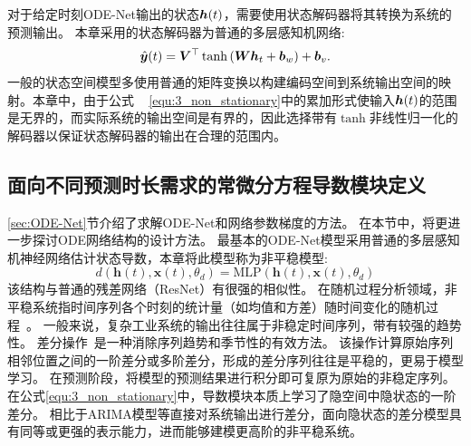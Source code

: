 对于给定时刻ODE-Net输出的状态$\boldsymbol h(t)$，需要使用状态解码器将其转换为系统的预测输出。
本章采用的状态解码器为普通的多层感知机网络:
\begin{equation}
    \hat{\boldsymbol y}(t) = \boldsymbol{V}^{\top} \tanh \left(\boldsymbol{W}\boldsymbol{h}_{t}+\boldsymbol{b}_{w}\right)+\boldsymbol b_{v}.
\end{equation}
一般的状态空间模型多使用普通的矩阵变换以构建编码空间到系统输出空间的映射。本章中，由于公式
~ \eqref{equ:3_non_stationary}中的累加形式使输入$\boldsymbol h(t)$的范围是无界的，而实际系统的输出空间是有界的，因此选择带有$\tanh$非线性归一化的解码器以保证状态解码器的输出在合理的范围内。



\subsection{面向不同预测时长需求的常微分方程导数模块定义}
\label{sec:derivative}
\ref{sec:ODE-Net}节介绍了求解ODE-Net和网络参数梯度的方法。
在本节中，将更进一步探讨ODE网络结构的设计方法。
最基本的ODE-Net模型采用普通的多层感知机神经网络估计状态导数\cite{chen2018neural}，本章将此模型称为非平稳模型:
\begin{equation}
\label{equ:3_non_stationary}
d\left(\boldsymbol{h}(t), \boldsymbol{x}(t), \theta_{d}\right)=\text{MLP}\left(\boldsymbol{h}(t), \boldsymbol{x}(t), \theta_{d}\right)
\end{equation}
该结构与普通的残差网络（ResNet）有很强的相似性。
在随机过程分析领域，非平稳系统指时间序列各个时刻的统计量（如均值和方差）随时间变化的随机过程~\cite{GUIDOLIN2018113}。
一般来说，复杂工业系统的输出往往属于非稳定时间序列，带有较强的趋势性。
差分操作~\cite{christoffersen2001forecasting}是一种消除序列趋势和季节性的有效方法。
该操作计算原始序列相邻位置之间的一阶差分或多阶差分，形成的差分序列往往是平稳的，更易于模型学习。
在预测阶段，将模型的预测结果进行积分即可复原为原始的非稳定序列。
在公式\eqref{equ:3_non_stationary}中，导数模块本质上学习了隐空间中隐状态的一阶差分。
相比于ARIMA模型等直接对系统输出进行差分，面向隐状态的差分模型具有同等或更强的表示能力，进而能够建模更高阶的非平稳系统。

